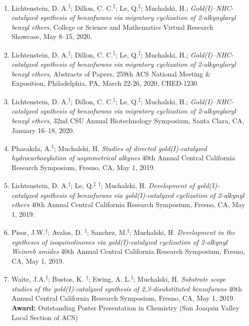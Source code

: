 \documentclass[11pt,letterpaper]{article}
\begin{document}
\begin{enumerate}[itemindent=0pt]
    \item{Lichtenstein, D. A.\textsuperscript{$\dagger$}; Dillon, C. C.\textsuperscript{$\ddagger$}; Le, Q.\textsuperscript{$\ddagger$}; Muchalski, H.; \emph{Gold(I)--NHC-catalyzed synthesis of benzofurans via migratory cyclization of 2-alkynylaryl benzyl ethers}, College or Science and Mathematics Virtual Research Showcase, May 8--15, 2020.}

    \item{Lichtenstein, D. A.\textsuperscript{$\dagger$}; Dillon, C. C.\textsuperscript{$\ddagger$}; Le, Q.\textsuperscript{$\ddagger$}; Muchalski, H.; \emph{Gold(I)--NHC-catalyzed synthesis of benzofurans via migratory cyclization of 2-alkynylaryl benzyl ethers}, Abstracts of Papers, 259th ACS National Meeting \& Exposition, Philadelphia, PA, March 22-26, 2020, CHED-1230}

    \item{Lichtenstein, D. A.\textsuperscript{$\dagger$}; Dillon, C. C.\textsuperscript{$\ddagger$}; Le, Q.\textsuperscript{$\ddagger$}; Muchalski, H.; \emph{Gold(I)--NHC-catalyzed synthesis of benzofurans via migratory cyclization of 2-alkynylaryl benzyl ethers}, 32nd CSU Annual Biotechnology Symposium, Santa Clara, CA, January 16--18, 2020.}

    \item{Phasakda, A.\textsuperscript{$\dagger$}; Muchalski, H. \emph{Studies of directed gold(I)-catalyzed hydrocarboxylation of usymmetrical alkynes} 40th Annual Central California Research Symposium, Fresno, CA, May 1, 2019.}
  
    \item{Lichtenstein, D. A.\textsuperscript{$\dagger$}; Le, Q.\textsuperscript{$\ddagger$} \textsuperscript{$\dagger$}; Muchalski, H. \emph{Development of gold(I)-catalyzed synthesis of benzofurans via gold(I)-catalyzed cyclization of 2-alkynyl ethers} 40th Annual Central California Research Symposium, Fresno, CA, May 1, 2019.
}
  
    \item{Pisor, J.W.\textsuperscript{$\dagger$}; Avalos, D. \textsuperscript{$\dagger$}; Sanchez, M.\textsuperscript{$\dagger$}; Muchalski, H. \emph{Development in the syntheses of isoquinolinones via gold(I)-catalyzed cyclization of 2-alkynyl Weinreb amides} 40th Annual Central California Research Symposium, Fresno, CA, May 1, 2019.
}
  
    \item{Waite, J.A.\textsuperscript{$\dagger$}; Bustos, K. \textsuperscript{$\dagger$}; Ewing, A. L.\textsuperscript{$\dagger$}; Muchalski, H. \emph{Substrate scope studies of the gold(I)-catalyzed synthesis of 2,3-disubstituted benzofurans} 40th Annual Central California Research Symposium, Fresno, CA, May 1, 2019.\\
\textbf{Award:} Outstanding Poster Presentation in Chemistry (San Joaquin Valley Local Section of ACS)
}


\end{enumerate}
\end{document}

